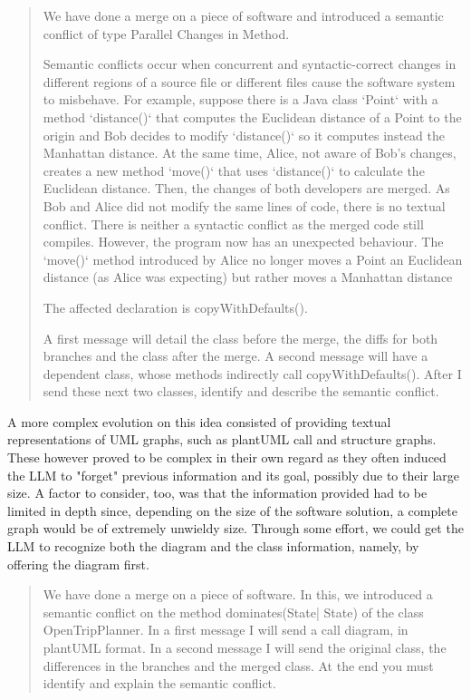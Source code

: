 \begin{quote}
We have done a merge on a piece of software and introduced a semantic conflict of type Parallel Changes in Method.

Semantic conflicts occur when concurrent and syntactic-correct changes in different regions of a source file or different files cause the software system to misbehave. For example, suppose there is a Java class `Point` with a method `distance()` that computes the Euclidean distance of a Point to the origin and Bob decides to modify `distance()` so it computes instead the Manhattan distance. At the same time, Alice, not aware of Bob's changes, creates a new method `move()` that uses `distance()` to calculate the Euclidean distance. Then, the changes of both developers are merged. As Bob and Alice did not modify the same lines of code, there is no textual conflict. There is neither a syntactic conflict as the merged code still compiles. However, the program now has an unexpected behaviour. The `move()` method introduced by Alice no longer moves a Point an Euclidean distance (as Alice was expecting) but rather moves a Manhattan distance

The affected declaration is copyWithDefaults().

A first message will detail the class before the merge, the diffs for both branches and the class after the merge. A second message will have a dependent class, whose methods indirectly call copyWithDefaults(). After I send these next two classes, identify and describe the semantic conflict.    
\end{quote}

A more complex evolution on this idea consisted of providing textual representations of UML graphs, such as plantUML call and structure graphs. These however proved to be complex in their own regard as they often induced the LLM to "forget" previous information and its goal, possibly due to their large size. A factor to consider, too, was that the information provided had to be limited in depth since, depending on the size of the software solution, a complete graph would be of extremely unwieldy size. Through some effort, we could get the LLM to recognize both the diagram and the class information, namely, by offering the diagram first.

\begin{quote}
We have done a merge on a piece of software. In this, we introduced a semantic conflict on the method dominates(State| State) of the class OpenTripPlanner. In a first message I will send a call diagram, in plantUML format. In a second message I will send the original class, the differences in the branches and the merged class.  At the end you must identify and explain the semantic conflict.
\end{quote}

